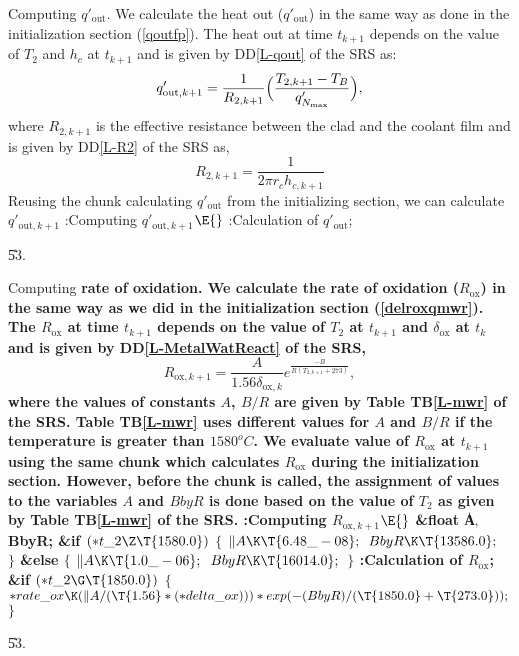 \documentclass[letterpaper,12pt,baseclass=report]{cweb-hy}
\begin{document}
{Computing $q'_{\text{out}}$.
We calculate the heat out ($q'_{\text{out}}$) in the same way as
done in the initialization section (\ref{qoutfp}). The heat out at time
$t_{k+1}$
depends on the
value of $T_{2}$ and $h_c$ at $t_{k+1}$ and is given by DD\ref{L-qout} of the
SRS as:
\begin{equation}
q'_{\text{out},k+1}=\frac{1}{R_{2,k+1}}\Bigl(\frac{T_{2,k+1}-T_B}
{ q'_{N_{\text{max}}}}\Bigr),
\end{equation}
where $R_{2,k+1}$ is the effective resistance between the clad and the coolant
film
and is given by DD\ref{L-R2} of the SRS as,
\begin{equation}
R_{2,k+1}=\frac{1}{2\pi r_c h_{c,k+1}}
\end{equation}
Reusing the chunk calculating $q'_{\text{out}}$ from the initializing section,
we can calculate  $q'_{\text{out},k+1}$
\Y\B\4:Computing $q'_{\text{out},k+1}$\X${}\E{}$\6
:Calculation of $q'_{\text{out}}$\X;\par
\U53.\fi


\fi

Computing \bf{rate of oxidation}.
We calculate the rate of oxidation  ($R_{\text{ox}}$) in the same way as
we did in the initialization section (\ref{delroxqmwr}). The $R_{\text{ox}}$
at time $t_{k+1}$ depends on the
value of $T_{2}$ at $t_{k+1}$ and $\delta_{\text{ox}}$ at $t_k$ and is given by
DD\ref{L-MetalWatReact} of the SRS,
\begin{equation}
{R_{\text{ox},k+1}}= \frac{A}{1.56  \delta_{\text{ox},k}} e^{\frac{-B}{R
(T_{2,k+1}+273)}},
\end{equation}
where the values of constants $A$, $B/R$ are given by Table TB\ref{L-mwr}
of the SRS. Table TB\ref{L-mwr} uses different values for $A$ and $B/R$ if
the temperature is greater than $1580^oC$.
We evaluate value of $R_{\text{ox}}$ at $t_{k+1}$ using the same chunk which
calculates
$R_{\text{ox}}$ during the initialization section. However, before the chunk is
called,
the assignment of values to the variables $A$ and $BbyR$ is done based on the
value of
$T_2$ as given by  Table TB\ref{L-mwr} of the SRS.
\Y\B\4:Computing $R_{\text{ox},k+1}$\X${}\E{}$\6
\&{float} \|A${},{}$ \\{BbyR};\7
\&{if} ${}({*}\\{t\_2}\Z\T{1580.0}){}$\5
${}\{{}$\1\6
${}\|A\K\T{6.48\_-08};{}$\6
${}\\{BbyR}\K\T{13586.0};{}$\6
\4${}\}{}$\2\6
\&{else}\5
${}\{{}$\1\6
${}\|A\K\T{1.0\_-06};{}$\6
${}\\{BbyR}\K\T{16014.0};{}$\6
\4${}\}{}$\2\6
:Calculation of $R_{\text{ox}}$\X;\6
\&{if} ${}({*}\\{t\_2}\G\T{1850.0}){}$\5
${}\{{}$\1\6
${}{*}\\{rate\_ox}\K(\|A/(\T{1.56}*({*}\\{delta\_ox})))*\\{exp}({-}(\\{BbyR})/(%
\T{1850.0}+\T{273.0}));{}$\6
\4${}\}{}$\2\par
\U53.\fi

}
\end{document}
